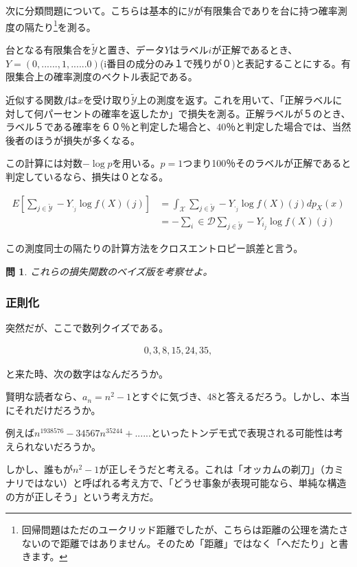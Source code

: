 \documentclass{jsarticle}
\newtheorem{pro}{問}[section]
\begin{document}
次に分類問題について。こちらは基本的に$\mathcal{Y}$が有限集合でありを台に持つ確率測度の隔たり\footnote{回帰問題はただのユークリッド距離でしたが、こちらは距離の公理を満たさないので距離ではありません。そのため「距離」ではなく「へだたり」と書きます。}を測る。

台となる有限集合を$\tilde{\mathcal{Y}}$と置き、データ$Y$はラベル$i$が正解であるとき、$Y=(0,......,1,......0)$(i番目の成分のみ１で残りが０)と表記することにする。有限集合上の確率測度のベクトル表記である。

近似する関数$f$は$x$を受け取り$\tilde{\mathcal{Y}}$上の測度を返す。これを用いて、「正解ラベルに対して何パーセントの確率を返したか」で損失を測る。正解ラベルが５のとき、ラベル５である確率を６０％と判定した場合と、40％と判定した場合では、当然後者のほうが損失が多くなる。

この計算には対数$-\log{p}$を用いる。$p=1$つまり100％そのラベルが正解であると判定しているなら、損失は０となる。

\begin{align}
E[\sum_{j\in\tilde{\mathcal{Y}}} -Y_{\cdot_j} \log{f(X)(j)}]&=\int_\mathcal{X} \sum_{j\in\tilde{\mathcal{Y}}} -Y_{\cdot_j} \log{f(X)(j)}dp_{X}(x)\\
&=-\sum_i\in\mathcal{D} \sum_{j\in\tilde{\mathcal{Y}}} -Y_{i_j} \log{f(X)(j)}
\end{align}

この測度同士の隔たりの計算方法をクロスエントロピー誤差と言う。

\begin{pro}
これらの損失関数のベイズ版を考察せよ。
\end{pro}


\subsubsection{正則化}

突然だが、ここで数列クイズである。

\begin{align}
0,3,8,15,24,35,
\end{align}

と来た時、次の数字はなんだろうか。

賢明な読者なら、$a_n=n^2-1$とすぐに気づき、48と答えるだろう。しかし、本当にそれだけだろうか。

例えば$n^1938576-34567n^35244+......$といったトンデモ式で表現される可能性は考えられないだろうか。

しかし、誰もが$n^2-1$が正しそうだと考える。これは「オッカムの剃刀」（カミナリではない）と呼ばれる考え方で、「どうせ事象が表現可能なら、単純な構造の方が正しそう」という考え方だ。
\end{document}
